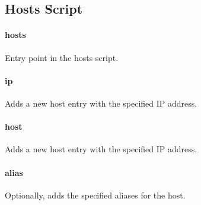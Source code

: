 \subsection{Hosts Script}

\paragraph{hosts}


Entry point in the hosts script.

\paragraph{ip}


Adds a new host entry with the specified IP address.

\paragraph{host}


Adds a new host entry with the specified IP address.

\paragraph{alias}


Optionally, adds the specified aliases for the host.

